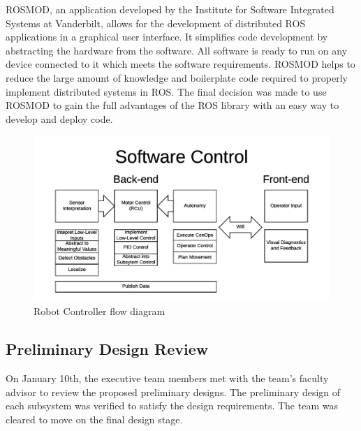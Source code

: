 \documentclass[class=article, crop=false]{standalone}
\begin{document}
	ROSMOD, an application developed by the Institute for Software Integrated Systems at Vanderbilt, allows for the development of distributed ROS applications in a graphical user interface. It simplifies code development by abstracting the hardware from the software. All software is ready to run on any device connected to it which meets the software requirements. ROSMOD helps to reduce the large amount of knowledge and boilerplate code required to properly implement distributed systems in ROS. The final decision was made to use ROSMOD to gain the full advantages of the ROS library with an easy way to develop and deploy code.

	\FloatBarrier
	\begin{figure}[h]
	\centering
	 \includegraphics[width=0.8\linewidth]{09_Figures/data-control-high-level.jpg}
	 \caption{Robot Controller flow diagram}
	 \label{fig:data-control}
	\end{figure}
	\FloatBarrier
	
	
	
	\subsection{Preliminary Design Review}
	
	On January 10th, the executive team members met with the team’s faculty advisor to review the proposed preliminary designs. The preliminary design of each subsystem was verified to satisfy the design requirements. The team was cleared to move on the final design stage. 

	
	


	
\end{document}
